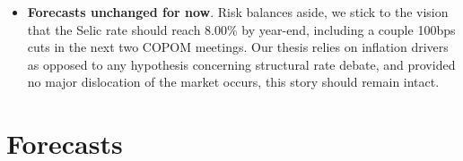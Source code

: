 \documentclass{report}
\begin{document}
\begin{figure}[h]\centering
{}
\end{figure}

\begin{itemize}
\item \textbf{Forecasts unchanged for now}. Risk balances aside, we stick to the
vision that the Selic rate should reach 8.00\% by year-end, including
a couple 100bps cuts in the next two COPOM meetings. Our thesis
relies on inflation drivers as opposed to any hypothesis concerning
structural rate debate, and provided no major dislocation of the
market occurs, this story should remain intact.
\end{itemize}

\newpage


\section{Forecasts}
\label{sec:orgde650d2}
\end{document}
